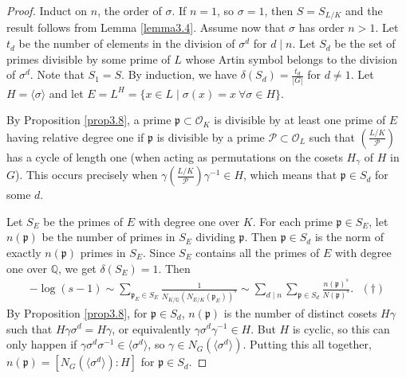 \documentclass{article}
\theoremstyle{definition}
\begin{document}
\begin{proof}
    Induct on $n$, the order of $\sigma$. If $n=1$, so $\sigma=1$, then $S=S_{L/K}$ and the result follows from Lemma \ref{lemma3.4}. Assume now that $\sigma$ has order $n>1$. Let $t_d$ be the number of elements in the division of $\sigma^d$ for $d \mid n$. Let $S_d$ be the set of primes divisible by some prime of $L$ whose Artin symbol belongs to the division of $\sigma^d$. Note that $S_1=S$. By induction, we have $\delta(S_d)=\frac{t_d}{\left|G\right|}$ for $d \neq 1$. Let $H = \langle \sigma \rangle$ and let $E = L^H = \{x \in L \mid \sigma(x)=x ~\forall \sigma \in H\}$.
    \vspace{1mm}
     
    By Proposition \ref{prop3.8}, a prime $\mathfrak{p} \subset \mathcal{O}_K$ is divisible by at least one prime of $E$ having relative degree one if $\mathfrak{p}$ is divisible by a prime $\mathcal{P} \subset \mathcal{O}_L$ such that $\left(\frac{L/K}{\mathcal{P}}\right)$ has a cycle of length one (when acting as permutations on the cosets $H_{\gamma}$ of $H$ in $G$). This occurs precisely when $\gamma \left(\frac{L/K}{\mathcal{P}}\right) \gamma^{-1} \in H$, which means that $\mathfrak{p} \in S_d$ for some $d$.
    \vspace{1mm}
     
    Let $S_E$ be the primes of $E$ with degree one over $K$. For each prime $\mathfrak{p} \in S_E$, let $n(\mathfrak{p})$ be the number of primes in $S_E$ dividing $\mathfrak{p}$. Then $\mathfrak{p} \in S_d$ is the norm of exactly $n(\mathfrak{p})$ primes in $S_E$. Since $S_E$ contains all the primes of $E$ with degree one over $\mathbb{Q}$, we get $\delta(S_E)=1$. Then 
    \begin{align*}
        -\log(s-1) \sim \sum_{\mathfrak{p}_E \in S_E}^{} \frac{1}{N_{K/\mathbb{Q}}(N_{E/K}(\mathfrak{p}_E))^s} \sim \sum_{d \mid n}^{} \sum_{\mathfrak{p} \in S_d}^{} \frac{n(\mathfrak{p})^s}{N(\mathfrak{p})^s}. ~~~ (\dagger)
    \end{align*} 
    By Proposition \ref{prop3.8}, for $\mathfrak{p} \in S_d$, $n(\mathfrak{p})$ is the number of distinct cosets $H \gamma$ such that $H \gamma \sigma^d = H \gamma$, or equivalently $\gamma \sigma^d \gamma^{-1}\in H$. But $H$ is cyclic, so this can only happen if $\gamma \sigma^d \sigma^{-1} \in \langle \sigma^d \rangle$, so $\gamma \in N_G(\langle \sigma^d \rangle)$. Putting this all together, $n(\mathfrak{p}) = [N_G(\langle \sigma^d \rangle) : H]$ for $\mathfrak{p} \in S_d$.
    \vspace{1mm}
     

\end{proof}
\end{document}
